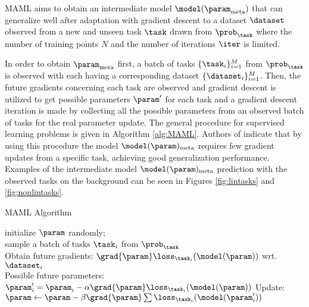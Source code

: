MAML aims to obtain an intermediate model $\model({\param}_{\text{meta}})$ that can generalize well after adaptation with gradient descent to a dataset $\dataset$ observed from a new and unseen task $\task$ drawn from $\prob_\task$ where the number of training points $N$ and the number of iterations $\iter$ is limited.  

In order to obtain $\param_{\text{meta}}$ first, a batch of tasks $\{\task_i\}_{i=1}^{M}$ from $\prob_{\task}$ is observed with each having a corresponding dataset $\{\dataset_i\}_{i=1}^{M}$. Then, the future gradients concerning each task are observed and gradient descent is utilized to get possible parameters $\param^\prime$ for each task and a gradient descent iteration is made by collecting all the possible parameters from an observed batch of tasks for the real parameter update. The general procedure for supervised learning problems is given in Algorithm \ref{alg:MAML}. Authors of \cite{finn2017} indicate that by using this procedure the model $\model({\param})_{\text{meta}}$ requires few gradient updates from a specific task, achieving good generalization performance. Examples of the intermediate model $\model({\param})_{\text{meta}}$ prediction with the observed tasks on the background can be seen in Figures \ref{fig:lintasks} and \ref{fig:nonlintasks}.

\begin{algorithm}
  \caption{MAML\cite{finn2017} Algorithm}\label{alg:MAML}
  \KwData{$\prob_{\task}$, $\alpha$, $\beta$}
  initialize $\param$ randomly; \\
  {
    sample a batch of tasks $\task_i$ from $\prob_{\task}$\\
    {
      Obtain future gradients: $\grad{\param}\loss_{\task_i}(\model(\param))$ wrt. $\dataset_i$ \\
      Possible future parameters: $\param_i^\prime = \param_i -\alpha\grad{\param}\loss_{\task_i}(\model(\param))$
    }
    Update: $\param \leftarrow \param- \beta\grad{\param}\sum\loss_{\task_i}(\model(\param_i^\prime))$
  }
\end{algorithm}

